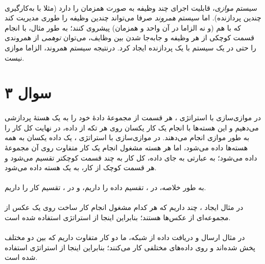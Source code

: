 \documentclass{article}
\begin{document}
	\paragraph*{}
	سیستم
	\textit{موازی}،
	قابلیت اجرای چند وظیفه به صورت همزمان را دارد (مثلا با به‌کارگیری چندین پردازنده). اما سیستم
	\textit{همروند}
	صرفا می‌تواند چندین وظیفه را طوری مدیریت کند که با هم (و نه الزاما در آن واحد و همزمان) پیشروی کنند؛ به طور مثال، با انجام قسمت کوچکی از هر وظیفه و جابه‌جا شدن بین وظایف، می‌توان
	\textit{توهمی}
	از همروندی را حتی در یک سیستم با یک پردازنده ایجاد کرد. درنتیجه سیستم همروند، الزاما موازی نیست.

	\section*{سوال ۳}
	\paragraph*{}
	در موازی‌سازی با استراتژی
	،
	هر قسمت از مجموعهٔ دادهٔ خود را به یک هستهٔ پردازشی می‌دهیم و این هسته‌ها با انجام یک کار یکسان روی هر تکه از داده، در نهایت کل کار را به طور موازی انجام می‌دهند.
	در موازی‌سازی با استراتژی
	،
	یک داده یکسان به همه هسته‌ها داده می‌شود، اما هر هسته مشغول انجام یک کار متفاوت روی آن مجموعهٔ داده می‌شود؛ به عبارتی به جای داده، کل کار به چند قسمت کوچکتر تقسیم می‌شود و هر قسمت کوچک از کار، به یک هسته داده می‌شود.

	\paragraph*{}
	به طور خلاصه، در
	،
	تقسیم داده را داریم، و در
	،
	تقسیم کار را داریم.

	\paragraph*{}
	در مثال ایجاد
	،
	چند
	داریم که هر کدام مشغول انجام کار ساخت
	روی یک عکس از مجموعه‌ای از عکس‌ها هستند؛ بنابراین اینجا از استراتژی
	استفاده شده است.

	\paragraph*{}
	در مثال ارسال و دریافت داده از شبکه، ما دو کار متفاوت داریم که بین دو
	مختلف پخش شده‌اند و روی داده‌های مختلفی کار می‌کنند؛ بنابراین اینجا از استراتژی
	استفاده شده است.
\end{document}
